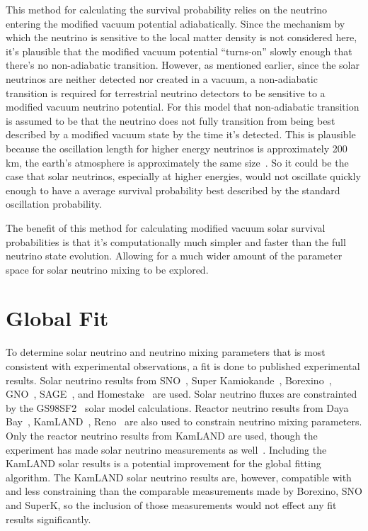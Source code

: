 This method for calculating the survival probability relies
on the neutrino entering the modified vacuum potential adiabatically.
Since the mechanism by which the neutrino is sensitive to the local matter
density is not considered here, it's plausible that the modified
vacuum potential ``turns-on'' slowly enough that there's no non-adiabatic
transition.
However, as mentioned earlier, since the solar neutrinos are neither
detected nor created in a vacuum, a non-adiabatic transition is required
for terrestrial neutrino detectors to be sensitive to a modified vacuum
neutrino potential.
For this model that non-adiabatic transition is assumed to be that the
neutrino does not fully transition from being best described
by a modified vacuum state by the time it's detected.
This is plausible because the oscillation length for higher
energy neutrinos is approximately 200\,km, the earth's atmosphere
is approximately the same size~\cite{atmosphere_profile}.
So it could be the case that solar neutrinos, especially at higher
energies, would not oscillate quickly enough to have a average
survival probability best described by the standard oscillation
probability. 

The benefit of this method for calculating modified vacuum solar survival
probabilities is that it's computationally much simpler and faster than the full
neutrino state evolution.
Allowing for a much wider amount of the parameter space for solar neutrino
mixing to be explored.



\section{Global Fit}
To determine solar neutrino and neutrino mixing parameters that is most
consistent with experimental observations, a fit is done to published
experimental results.
Solar neutrino results from SNO~\cite{LETA?}, Super Kamiokande~\cite{Superk1234},
Borexino~\cite{Bx1,Bx2}, GNO~\cite{XXX}, SAGE~\cite{XXX}, and
Homestake~\cite{XXX} are used.
Solar neutrino fluxes are constrainted by the GS98SF2~\cite{} solar model calculations.
Reactor neutrino results from Daya Bay~\cite{}, KamLAND~\cite{}, Reno~\cite{}
are also used to constrain neutrino mixing parameters.
Only the reactor neutrino results from KamLAND are used, though
the experiment has made solar neutrino measurements as well~\cite{kamland_be7, kamland_b8}.
Including the KamLAND solar results is a potential improvement for the global fitting
algorithm. The KamLAND solar neutrino results are, however, compatible
with and less constraining than the comparable measurements made by Borexino, SNO and SuperK,
so the inclusion of those measurements would not effect any fit results significantly.

